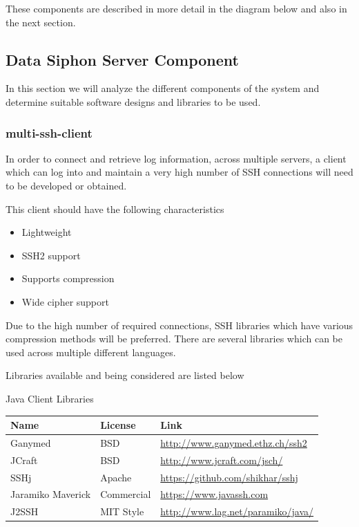 \documentclass{llncs}
\begin{document}
These components are described in more detail in the diagram below and also in the next section.
  
\subsection{Data Siphon Server Component}

In this section we will analyze the different components of the system and determine suitable software designs and libraries to be used.

\subsubsection{multi-ssh-client}

In order to connect and retrieve log information, across multiple servers, a client which can log into and maintain a very high number of SSH connections will need to be developed or obtained.

This client should have the following characteristics

\begin{itemize}
\item Lightweight
\item	SSH2 support
\item	Supports compression
\item	Wide cipher support
\end{itemize}

Due to the high number of required connections, SSH libraries which have various compression methods will be preferred. There are several libraries which can be used across multiple different languages.

Libraries available and being considered are listed below

Java Client Libraries

\begin{flushleft}
    \begin{tabular}{ | l | l | l |}
    \hline
    Name & License & Link \\ \hline
    Ganymed & BSD & \url{http://www.ganymed.ethz.ch/ssh2}  \\ \hline
    JCraft & BSD & \url{http://www.jcraft.com/jsch/}\\ \hline
    SSHj & Apache &  \url{https://github.com/shikhar/sshj}  \\ \hline
    Jaramiko Maverick &  Commercial &  \url{https://www.javassh.com}  \\ \hline
    J2SSH & MIT Style &  \url{http://www.lag.net/paramiko/java/} \\
    \hline
    \end{tabular}
\end{flushleft}
\end{document}
